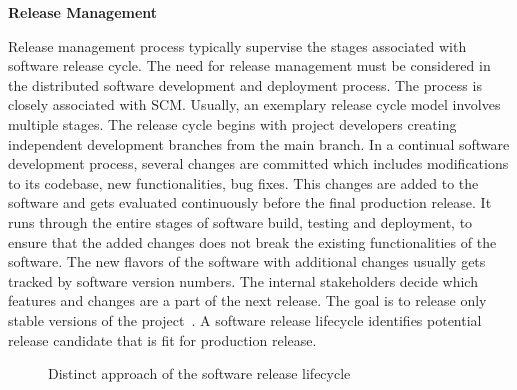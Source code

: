 \vspace{0.2cm}
\noindent \textbf{Release Management}
\vspace{0.2cm}

\noindent     Release management process typically supervise the stages associated with software release cycle. The need for release management must be considered in the distributed software development and deployment process. The process is closely associated with \ac{SCM}. Usually, an exemplary release cycle model involves multiple stages. The release cycle begins with project developers creating independent development branches from the main branch. In a continual software development process, several changes are committed  which includes modifications to its codebase, new functionalities, bug fixes. This changes are added to the software and gets evaluated continuously before the final production release.  It runs through the entire stages of software build, testing and deployment, to ensure that the added changes does not break the existing functionalities of the software. The new flavors of the software with additional changes usually gets tracked by software version numbers. The internal stakeholders decide which features and changes are a part of the next release. The goal is to release only stable versions of the project~\parencite{russo2003toward}. A software release lifecycle identifies potential release candidate that is fit for production release.

\vspace{0.5cm}
\begin{figure}[H]
\caption{Distinct approach of the software release lifecycle}\label{fig:softwarereleaselifecycleSteps}
\end{figure}
\vspace{0.5cm}

